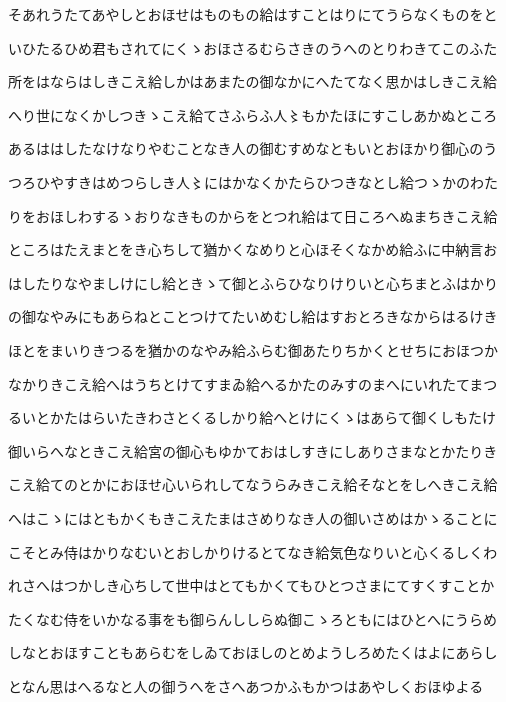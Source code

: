 \documentclass[a4paper,11pt,landscape]{ltjtarticle}
\begin{document}
\par\medskip
そあれうたてあやしとおほせはものもの給はすことはりにてうらなくものをと
\par\medskip
いひたるひめ君もされてにくゝおほさるむらさきのうへのとりわきてこのふた
\par\medskip
所をはならはしきこえ給しかはあまたの御なかにへたてなく思かはしきこえ給
\par\medskip
へり世になくかしつきゝこえ給てさふらふ人〻もかたほにすこしあかぬところ
\par\medskip
あるははしたなけなりやむことなき人の御むすめなともいとおほかり御心のう
\par\medskip
つろひやすきはめつらしき人〻にはかなくかたらひつきなとし給つゝかのわた
\par\medskip
りをおほしわするゝおりなきものからをとつれ給はて日ころへぬまちきこえ給
\par\medskip
ところはたえまとをき心ちして猶かくなめりと心ほそくなかめ給ふに中納言お
\par\medskip
はしたりなやましけにし給ときゝて御とふらひなりけりいと心ちまとふはかり
\par\medskip
の御なやみにもあらねとことつけてたいめむし給はすおとろきなからはるけき
\par\medskip
ほとをまいりきつるを猶かのなやみ給ふらむ御あたりちかくとせちにおほつか
\par\medskip
なかりきこえ給へはうちとけてすまゐ給へるかたのみすのまへにいれたてまつ
\par\medskip
るいとかたはらいたきわさとくるしかり給へとけにくゝはあらて御くしもたけ
\par\medskip
御いらへなときこえ給宮の御心もゆかておはしすきにしありさまなとかたりき
\par\medskip
こえ給てのとかにおほせ心いられしてなうらみきこえ給そなとをしへきこえ給
\par\medskip
へはこゝにはともかくもきこえたまはさめりなき人の御いさめはかゝることに
\par\medskip
こそとみ侍はかりなむいとおしかりけるとてなき給気色なりいと心くるしくわ
\par\medskip
れさへはつかしき心ちして世中はとてもかくてもひとつさまにてすくすことか
\par\medskip
たくなむ侍をいかなる事をも御らんししらぬ御こゝろともにはひとへにうらめ
\par\medskip
しなとおほすこともあらむをしゐておほしのとめようしろめたくはよにあらし
\par\medskip
となん思はへるなと人の御うへをさへあつかふもかつはあやしくおほゆよる
\end{document}
